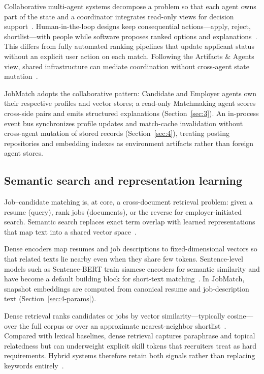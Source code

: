 Collaborative multi-agent systems decompose a problem so that each agent owns part of the state and a coordinator integrates read-only views for decision support~\cite{Wooldridge2009}.
Human-in-the-loop designs keep consequential actions---apply, reject, shortlist---with people while software proposes ranked options and explanations~\cite{Johnson2025HITeams}.
This differs from fully automated ranking pipelines that update applicant status without an explicit user action on each match.
Following the Artifacts \& Agents view, shared infrastructure can mediate coordination without cross-agent state mutation~\cite{Omicini2008Artifacts}.

JobMatch adopts the collaborative pattern: Candidate and Employer agents own their respective profiles and vector stores; a read-only Matchmaking agent scores cross-side pairs and emits structured explanations (Section~\ref{sec:3}).
An in-process event bus synchronizes profile updates and match-cache invalidation without cross-agent mutation of stored records (Section~\ref{sec:4}), treating posting repositories and embedding indexes as environment artifacts rather than foreign agent stores.

\subsection{Semantic search and representation learning}\label{sec:2-semantic}

Job--candidate matching is, at core, a cross-document retrieval problem: given a resume (query), rank jobs (documents), or the reverse for employer-initiated search.
Semantic search replaces exact term overlap with learned representations that map text into a shared vector space~\cite{Manning2008}.

Dense encoders map resumes and job descriptions to fixed-dimensional vectors so that related texts lie nearby even when they share few tokens.
Sentence-level models such as Sentence-BERT train siamese encoders for semantic similarity and have become a default building block for short-text matching~\cite{Reimers2019}.
In JobMatch, snapshot embeddings are computed from canonical resume and job-description text (Section~\ref{sec:4-params}).

Dense retrieval ranks candidates or jobs by vector similarity---typically cosine---over the full corpus or over an approximate nearest-neighbor shortlist~\cite{Reimers2019,Manning2008}.
Compared with lexical baselines, dense retrieval captures paraphrase and topical relatedness but can underweight explicit skill tokens that recruiters treat as hard requirements.
Hybrid systems therefore retain both signals rather than replacing keywords entirely~\cite{Manning2008,Reimers2019}.

